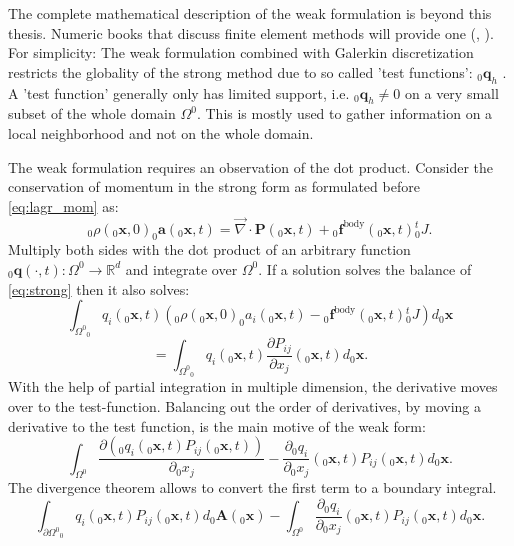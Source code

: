 \documentclass[m,times]{cgMA}
\begin{document}
The complete mathematical description of the weak formulation is beyond this thesis. Numeric books that discuss finite element methods will provide one (\cite{bathe2006finite}, \cite{dahmen2008numerik}). For simplicity: The weak formulation combined with Galerkin discretization restricts the globality of the strong method due to so called 'test functions': $_0\boldsymbol{q}_h$ . A 'test function' generally only has limited support, i.e. $ _0\boldsymbol{q}_h\neq 0$ on a very small subset of the whole domain $\Omega^0$. This is mostly used to gather information on a local neighborhood and not on the whole domain.

The weak formulation requires an observation of the dot product. Consider the conservation of momentum in the strong form as formulated before \ref{eq:lagr_mom} as:
\begin{equation}\label{eq:strong}
  _0\rho(_0\boldsymbol{x},0)_0\boldsymbol{a}(_0\boldsymbol{x},t)
  = \vec{\nabla} \cdot \boldsymbol{P}(_0\boldsymbol{x},t) + {_0\boldsymbol{f}} ^ {\text{body}}(_0\boldsymbol{x},t) {^t_0J}.
\end{equation}
Multiply both sides with the dot product of an arbitrary function $_0\boldsymbol{q}(\cdot,t):\Omega^0 \rightarrow \mathbb{R}^d$ and integrate over $\Omega^0$. If a solution solves the balance of \ref{eq:strong} then it also solves:
$$
\int _ { \Omega ^ { 0 } } _0q _ { i } ( _0\boldsymbol { x } , t ) \left(_0\rho (_0\boldsymbol{x} , 0 ) _0a _{ i } (_0\boldsymbol{x} , t ) - {_0\boldsymbol{f}} ^ {\text{body}}(_0\boldsymbol{x},t) {^t_0J}\right) d _0\boldsymbol{x}
$$
\begin{equation}
  =\int _ { \Omega ^ { 0 } } _0q _ { i } ( _0\boldsymbol { x } , t ) \frac{\partial P _ {ij}}{\partial x_j} ( _0\boldsymbol{x} , t ) d_0\boldsymbol{x}.
\end{equation}
With the help of partial integration in multiple dimension, the derivative moves over to the test-function. Balancing out the order of derivatives, by moving a derivative to the test function, is the main motive of the weak form:
$$
\int _ { \Omega ^ { 0 } } \frac{\partial (_0q _ { i } ( _0\boldsymbol { x } , t ) P _ {ij} ( _0\boldsymbol{x} , t ))}{\partial _0x_j}
- \frac{\partial _0q _ { i }}{\partial _0x_j} ( _0\boldsymbol { x } , t ) P _ {ij}( _0\boldsymbol{x} , t )
d_0\boldsymbol{x}.
$$
The divergence theorem allows to convert the first term to a boundary integral.
\begin{equation}
  \int _ { \partial \Omega ^ { 0 } } _0q _ { i } ( _0\boldsymbol { x } , t ) P _ {ij} ( _0\boldsymbol{x} , t)
  d_0\boldsymbol{A}(_0\boldsymbol{x})
  -\int _ { \Omega ^ { 0 } }  \frac{\partial _0q _ { i }}{\partial _0x_j} ( _0\boldsymbol { x } , t ) P _ {ij}( _0\boldsymbol{x} , t )
  d_0\boldsymbol{x}.
\end{equation}
\end{document}
